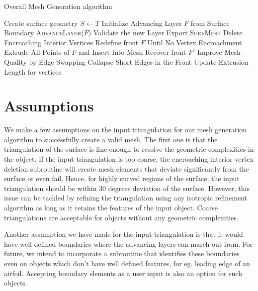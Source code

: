 \documentclass[conf]{new-aiaa}
\begin{document}
\begin{algorithm}[hbt!]
\caption{Overall Mesh Generation algorithm}\label{alg:euclid}
\begin{algorithmic}[1]
\State Create surface geometry $S \gets T$
\State Initialize Advancing Layer $F$ from Surface Boundary
\State \textsc{AdvanceLayer($F$)}
\State Validate the new Layer
\EndWhile \label{advancing-layer-routine}
\State Export \textsc{SurfMesh}
\EndProcedure
{}
\State Delete Encroaching Interior Vertices
\State Redefine front $F$ Until No Vertex Encroachment
\State Extrude All Points of $F$ and Insert Into Mesh
\State Recover front $F'$ 
\State Improve Mesh Quality by Edge Swapping 
\State Collapse Short Edges in the Front
\State Update Extrusion Length for vertices
\EndProcedure
\end{algorithmic}
\label{algo}
\end{algorithm}

\section{Assumptions}

We make a few assumptions on the input triangulation for our mesh generation algorithm to successfully create a valid mesh. The first one is that the triangulation of the surface is fine enough to resolve the geometric complexities in the object. If the input triangulation is too coarse, the encroaching interior vertex deletion subroutine will create mesh elements that deviate significantly from the surface or even fail. Hence, for highly curved regions of the surface, the input triangulation should be within 30 degrees deviation of the surface. However, this issue can be tackled by refining the triangulation using any isotropic refinement algorithm as long as it retains the features of the input object. Coarse triangulations are acceptable for objects without any geometric complexities.

Another assumption we have made for the input triangulation is that it would have well defined boundaries where the advancing layers can march out from. For future, we intend to incorporate a subroutine that identifies these boundaries even on objects which don't have well defined features, for eg. leading edge of an airfoil. Accepting boundary elements as a user input is also an option for such objects.
\end{document}
